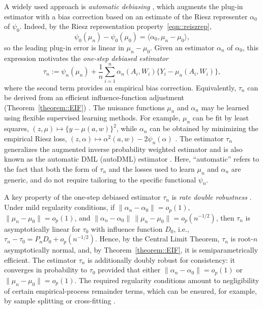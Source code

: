\documentclass[11pt]{article}
\theoremstyle{plain}
\begin{document}
A widely used approach is \emph{automatic debiasing}
\citep{chernozhukov2018double,chernozhukov2022automatic,van2025automaticDML},
which augments the plug-in estimator with a bias correction based on an estimate
of the Riesz representer \(\alpha_0\) of \(\psi_0\). Indeed, by the Riesz
representation property~\eqref{eqn::reiszrep},
\[
\psi_0(\mu_n)-\psi_0(\mu_0)
=
\langle \alpha_0,\mu_n-\mu_0\rangle,
\]
so the leading plug-in error is linear in \(\mu_n-\mu_0\). Given an estimator
\(\alpha_n\) of \(\alpha_0\), this expression motivates the \textit{one-step debiased estimator}
\[
\tau_n
:=
\psi_n(\mu_n)
+
\frac{1}{n}\sum_{i=1}^n \alpha_n(A_i,W_i)\{Y_i-\mu_n(A_i,W_i)\},
\]
where the second term provides an empirical bias correction. Equivalently,
\(\tau_n\) can be derived from an efficient influence-function adjustment
(Theorem~\ref{theorem::EIF}) \citep{bickel1993efficient}. The nuisance functions \(\mu_n\) and \(\alpha_n\)
may be learned using flexible supervised learning methods. For example, \(\mu_n\)
can be fit by least squares, \((z,\mu)\mapsto\{y-\mu(a,w)\}^2\), while \(\alpha_n\)
can be obtained by minimizing the empirical Riesz loss,
\((z,\alpha)\mapsto \alpha^2(a,w)-2\psi_n(\alpha)\)
\citep{chernozhukov2018double,chernozhukov2022riesznet}. The estimator \(\tau_n\)
generalizes the augmented inverse probability weighted estimator
\citep{robinsCausal,robins1995analysis,bang2005doubly,bruns2023augmented}
and is also known as the automatic DML (autoDML) estimator
\citep{chernozhukov2022automatic,chernozhukov2022riesznet,van2025automaticDML}.
Here, ``automatic'' refers to the fact that both the form of \(\tau_n\) and the
losses used to learn \(\mu_n\) and \(\alpha_n\) are generic, and do not require
tailoring to the specific functional \(\psi_n\).

A key property of the one-step debiased estimator \(\tau_n\) is \emph{rate double
robustness} \citep{bradic2019minimax, rotnitzky2021characterization}. Under mild regularity
conditions, if \(\|\alpha_n-\alpha_0\|=o_p(1)\), \(\|\mu_n-\mu_0\|=o_p(1)\), and
\(\|\alpha_n-\alpha_0\|\,\|\mu_n-\mu_0\|=o_p(n^{-1/2})\), then \(\tau_n\) is
asymptotically linear for \(\tau_0\) with influence function \(D_0\), i.e.,
\(\tau_n-\tau_0 = P_nD_0 + o_p(n^{-1/2})\). Hence, by the Central Limit Theorem, \(\tau_n\) is root-\(n\) asymptotically
normal, and, by Theorem~\ref{theorem::EIF}, it is semiparametrically efficient. The estimator \(\tau_n\) is additionally doubly
robust for consistency: it converges in probability to \(\tau_0\) provided that
either \(\|\alpha_n-\alpha_0\|=o_p(1)\) or \(\|\mu_n-\mu_0\|=o_p(1)\). The
required regularity conditions amount to negligibility of certain
empirical-process remainder terms, which can be ensured, for example, by sample
splitting or cross-fitting \citep{schick1986asymptotically,
vanderLaanRose2011, chernozhukov2018double}.
\end{document}
